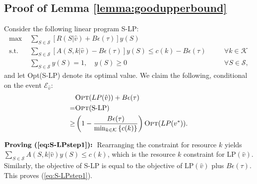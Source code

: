 \documentclass{article}
\theoremstyle{definition}
\newcommand{\KKK}{\mathcal{K}}
\newcommand{\SSS}{\mathcal{S}}
\begin{document}
\subsection{Proof of Lemma \ref{lemma:goodupperbound}} \label{app:pflemmagoodupperbound}
Consider the following linear program S-LP:
\begin{subequations}
\begin{alignat}{3}
\text{max }    &\sum_{S\in \SSS} \left[R(S|\hat{v}) + B\epsilon(\tau)\right]y(S) \label{eq:S-LP.1}\\
\text{s.t. }   &\sum_{S\in \SSS} \left[A(S, k | \hat{v}) - B\epsilon(\tau)\right]y(S) \leq c(k) -  B\epsilon(\tau)   &\quad &\forall k \in \KKK \label{eq:S-LP.2}\\
&\sum_{S\in \SSS}y(S) = 1, \quad y(S)\geq   0 &\quad & \forall S\in \SSS \label{eq:S-LP.3},
\end{alignat}
\end{subequations}
and let {\sc Opt}(S-LP) denote its optimal value. We claim the following, conditional on the event $\mathcal{E}_{\hat{v}}$:
\begin{align}
&\text{{\sc Opt}}(LP(\hat{v}))+ B\epsilon(\tau)\nonumber\\
= &\text{{\sc Opt}(S-LP)} \label{eq:S-LPstep1}\\
\geq &\left(1 - \frac{B\epsilon(\tau)}{\min_{k\in \KKK}\left\{c(k)\right\}}\right)\text{{\sc Opt}}(LP(v^*)).\label{eq:S-LPstep2}
\end{align}

$\textbf{Proving (\ref{eq:S-LPstep1}): }$Rearranging the constraint for resource $k$ yields $\sum_{S\in \SSS}A(S, k|\hat{v})y(S)\leq c(k)$, which is the resource $k$ constraint for LP$(\hat{v})$. Similarly, the objective of S-LP is equal to the objective of LP$(\hat{v})$ plus $B\epsilon(\tau)$. This proves (\ref{eq:S-LPstep1}).
\end{document}
